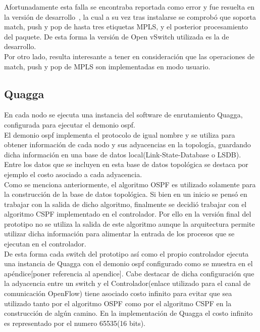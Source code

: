 Afortunadamente esta falla se encontraba reportada como error y fue resuelta en la versi\'on de desarrollo~\citep{OVSSourceCode}, la cual a su vez tras instalarse se comprobó que soporta match, push y pop de hasta tres etiquetas MPLS, y el posterior procesamiento del paquete. De esta forma la versi\'on de Open vSwitch utilizada es la de desarrollo.\\

Por otro lado, resulta interesante a tener en consideraci\'on que las operaciones de match, push y pop de MPLS son implementadas en modo usuario.


\subsection{Quagga}
En cada nodo se ejecuta una instancia del software de enrutamiento Quagga, configurada para ejecutar el demonio ospf.\\ 

El demonio ospf implementa el protocolo de igual nombre y se utiliza para obtener información de cada nodo y sus adyacencias en la topolog\'ia, guardando dicha información en una base de datos local(Link-State-Database o LSDB). Entre los datos que se incluyen en esta base de datos topol\'ogica se destaca por ejemplo el costo asociado a cada adyacencia.\\ 

Como se menciona anteriormente, el algoritmo OSPF es utilizado solamente para la construcci\'on de la base de datos topol\'ogica. Si bien en un inicio se pensó en trabajar con la salida de dicho algoritmo, finalmente se decidió trabajar con el algoritmo CSPF implementado en el controlador. Por ello en la versi\'on final del prototipo no se utiliza la salida de este algoritmo aunque la arquitectura permite utilizar dicha información para alimentar la entrada de los procesos que se ejecutan en el controlador.\\

De esta forma cada switch del prototipo así como el propio controlador ejecuta una instancia de Quagga con el demonio ospf configurado como se muestra en el apéndice[poner referencia al apendice]. Cabe destacar de dicha configuración que la adyacencia entre un switch y el Controlador(enlace utilizado para el canal de comunicación OpenFlow) tiene asociado costo infinito para evitar que sea utilizado tanto por el algoritmo OSPF como por el algoritmo CSPF en la construcción de algún camino. En la implementaci\'on de Quagga el costo infinito es representado por el numero 65535(16 bits).

